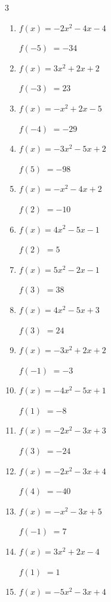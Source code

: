\begin{multicols}{3}
\begin{enumerate}
$f(-3)$
        $= 19$

\columnbreak %

  \item $f(x)=-2x^{2}-4x-4$

$f(-5)$
        $= -34$

  \item $f(x)=3x^{2}+2x+2$

$f(-3)$
        $= 23$

  \item $f(x)=-x^{2}+2x-5$

$f(-4)$
        $= -29$

  \item $f(x)=-3x^{2}-5x+2$

$f(5)$
        $= -98$

  \item $f(x)=-x^{2}-4x+2$

$f(2)$
        $= -10$

  \item $f(x)=4x^{2}-5x-1$

$f(2)$
        $= 5$

  \item $f(x)=5x^{2}-2x-1$

$f(3)$
        $= 38$

  \item $f(x)=4x^{2}-5x+3$

$f(3)$
        $= 24$

  \item $f(x)=-3x^{2}+2x+2$

$f(-1)$
        $= -3$

  \item $f(x)=-4x^{2}-5x+1$

$f(1)$
        $= -8$

  \item $f(x)=-2x^{2}-3x+3$

$f(3)$
        $= -24$

  \item $f(x)=-2x^{2}-3x+4$

$f(4)$
        $= -40$

  \item $f(x)=-x^{2}-3x+5$

$f(-1)$
        $= 7$

  \item $f(x)=3x^{2}+2x-4$

$f(1)$
        $= 1$

  \item $f(x)=-5x^{2}-3x+4$


\end{enumerate}
\end{multicols}
